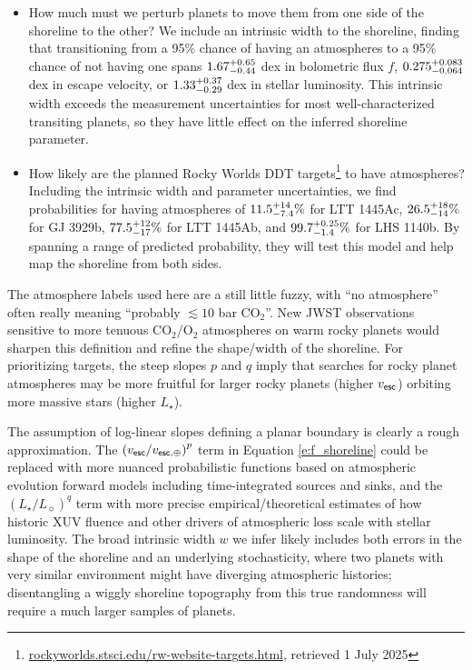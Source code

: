 \documentclass[modern,linenumbers,trackchanges]{aastex7}
\begin{document}
\begin{itemize}
\item How much must we perturb planets to move them from one side of the shoreline to the other? We include an intrinsic width to the shoreline, finding that transitioning from a 95\% chance of having an atmospheres to a 95\% chance of not having one spans  $1.67_{-0.44}^{+0.65}$ dex in bolometric flux $f$, $0.275_{-0.064}^{+0.083}$ dex in escape velocity, or $1.33_{-0.29}^{+0.37}$ dex in stellar luminosity. This intrinsic width exceeds the measurement uncertainties for most well-characterized transiting planets, so they have little effect on the inferred shoreline parameter.


\item How likely are the planned Rocky Worlds DDT targets\footnote{\href{https://rockyworlds.stsci.edu/rw-website-targets.html}{rockyworlds.stsci.edu/rw-website-targets.html}, retrieved 1 July 2025} to have atmospheres? Including the intrinsic width and parameter uncertainties, we find probabilities for having atmospheres of $11.5_{-7.4}^{+14}\%$ for LTT 1445Ac, $26.5_{-14}^{+18}\%$ for  GJ 3929b, $77.5_{-17}^{+12}\%$ for LTT 1445Ab, and $99.7_{-1.4}^{+0.25}\%$ for LHS 1140b. By spanning a range of predicted probability, they will test this model and help map the shoreline from both sides.
\end{itemize}

The atmosphere labels used here are a still little fuzzy, with ``no atmosphere'' often really meaning ``probably $\lesssim 10$ bar CO$_2$''. New JWST observations sensitive to more tenuous CO$_2$/O$_2$ atmospheres on warm rocky planets would sharpen this definition and refine the shape/width of the shoreline. For prioritizing targets, the steep slopes $p$ and $q$ imply that searches for rocky planet atmospheres may be more fruitful for larger rocky planets (higher $v_{\sf esc}$) orbiting more massive stars (higher $L_\star$). 

The assumption of log-linear slopes defining a planar boundary is clearly a rough approximation. The $\left(v_{\sf esc}/v_{\sf esc, \oplus}\right)^p$ term in Equation \ref{e:f_shoreline} could be replaced with more nuanced probabilistic functions based on atmospheric evolution forward models including time-integrated sources and sinks, and the $\left(L_\star/L_\sun\right)^q$ term with more precise empirical/theoretical estimates of how historic XUV fluence and other drivers of atmospheric loss scale with stellar luminosity. The broad intrinsic width $w$ we infer likely includes both errors in the shape of the shoreline and an underlying stochasticity, where two planets with very similar environment might have diverging atmospheric histories; disentangling a wiggly shoreline topography from this true randomness will require a much larger samples of planets. 
\end{document}
